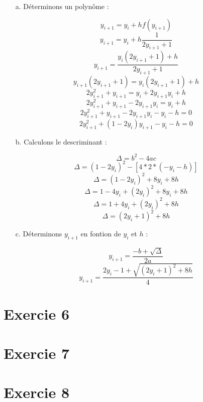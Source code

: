 \documentclass[12pt, letterpaper]{article}
\begin{document}
\begin{enumerate}
\item[a.] Déterminons un polynôme :

$$ y_{i+1} = y_i + h f(y_{i+1})$$
$$ y_{i+1} = y_i + h \frac{1}{2y_{i+1} + 1}$$
$$ y_{i+1} = \frac{y_i (2y_{i+1} + 1) + h}{2y_{i+1} + 1} $$
$$ y_{i+1} (2y_{i+1} + 1) = y_i (2y_{i+1} + 1) + h $$
$$ 2y_{i+1}^2 + y_{i+1} = y_i + 2y_{i+1}y_i + h $$
$$ 2y_{i+1}^2 + y_{i+1} - 2y_{i+1}y_i = y_i + h $$
$$ 2y_{i+1}^2 + y_{i+1} - 2y_{i+1}y_i - y_i - h = 0 $$
$$ 2y_{i+1}^2 + (1 - 2y_i) y_{i+1} - y_i - h = 0 $$

\item[b.] Calculons le descriminant :

$$ \Delta = b^2 - 4ac $$
$$ \Delta = (1 - 2y_i)^2 - [4 * 2 * (- y_i - h)] $$
$$ \Delta = (1 - 2y_i)^2 + 8y_i + 8h $$
$$ \Delta = 1 - 4y_i + (2y_i)^2 + 8y_i + 8h $$
$$ \Delta = 1 + 4y_i + (2y_i)^2 + 8h $$
$$ \Delta = (2y_i + 1)^2 + 8h $$

\item[c.] Déterminons $y_{i+1}$ en fontion de $y_i$ et $h$ :

$$ y_{i+1} = \frac{- b + \sqrt{\Delta}}{2a} $$
$$ y_{i+1} = \frac{2y_i - 1 + \sqrt{(2y_i + 1)^2 + 8h}}{4} $$

\end{enumerate}

\section{Exercie 6}

\section{Exercie 7}

\section{Exercie 8}
\end{document}
